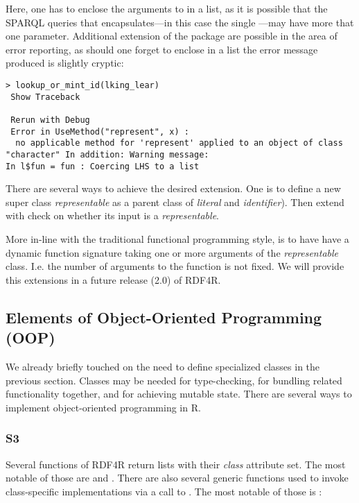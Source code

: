 Here, one has to enclose the arguments to  in a list, as it is possible that the SPARQL queries that  encapsulates---in this case the single ---may have more that one parameter. Additional extension of the package are possible in the area of error reporting, as should one forget to enclose  in a list the error message produced is slightly cryptic:

\begin{lstlisting}[style=customr]
> lookup_or_mint_id(lking_lear)
 Show Traceback
 
 Rerun with Debug
 Error in UseMethod("represent", x) : 
  no applicable method for 'represent' applied to an object of class "character" In addition: Warning message:
In l$fun = fun : Coercing LHS to a list
\end{lstlisting}

There are several ways to achieve the desired extension. One is to define a new super class \emph{representable} as a parent class of \emph{literal} and \emph{identifier}). Then extend  with check on whether its input is a \emph{representable}.

More in-line with the traditional functional programming style, is to have  have a dynamic function signature taking one or more arguments of the \emph{representable} class. I.e. the number of arguments to the function is not fixed. We will provide this extensions in a future release (2.0) of RDF4R.

\subsection{Elements of Object-Oriented Programming (OOP)}

We already briefly touched on the need to define specialized classes in the previous section. Classes may be needed for type-checking, for bundling related functionality together, and for achieving mutable state. There are several ways to implement object-oriented programming in R.

\subsubsection{S3}

Several functions of RDF4R return lists with their \emph{class} attribute set. The most notable of those are  and . There are also several generic functions used to invoke class-specific implementations via a call to . The most notable of those is :

